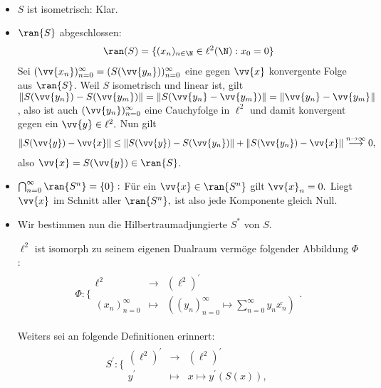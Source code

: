 \begin{solution}
  \leavevmode \\
  \begin{itemize}
      \item $S$ ist isometrisch: Klar.
      \item $\ran{S}$ abgeschlossen:
      \begin{align*}
        \ran(S) = \{(x_n)_{n \in \N} \in \ell^2(\N): x_0 = 0\}
      \end{align*}
      Sei $(\vv{x_n})_{n=0}^\infty =
      (S(\vv{y_n}))_{n=0}^\infty$ eine gegen $\vv{x}$ konvergente Folge aus $\ran{S}$. Weil $S$ isometrisch und linear ist, gilt
      $\| S(\vv{y_n}) - S(\vv{y_m})\|
      = \| S(\vv{y_n} - \vv{y_m}) \|
      = \| \vv{y_n} - \vv{y_m} \|$, also ist auch $(\vv{y_n})_{n=0}^\infty$ eine Cauchyfolge in $\ell^2$ und damit konvergent gegen ein $\vv{y} \in \ell^2.$ Nun gilt
      \begin{align*}
       \| S(\vv{y}) - \vv{x} \| \leq
       \| S(\vv{y}) - S(\vv{y_n}) \| + \| S(\vv{y_n}) - \vv{x} \|
       \stackrel{n \rightarrow \infty}{\longrightarrow} 0,
      \end{align*}
      also $\vv{x} = S(\vv{y}) \in \ran{S}$.
      \item $\bigcap_{n=0}^\infty \ran{S^n} = \{0\}:$ Für ein $\vv{x} \in \ran{S^n}$ gilt $\vv{x}_n = 0.$ Liegt $\vv{x}$ im Schnitt aller $\ran{S^n},$ ist also jede Komponente gleich Null.
      \item Wir bestimmen nun die Hilbertraumadjungierte $S^*$ von $S.$

      $\ell^2$ ist isomorph zu seinem eigenen Dualraum vermöge folgender Abbildung $\Phi$:
      \begin{align*}
            \Phi: \Bigg\{\begin{matrix}
       \ell^2 & \rightarrow & (\ell^2)^\prime \\
      (x_n)_{n=0}^\infty & \mapsto & ((y_n)_{n=0}^\infty \mapsto \sum_{n=0}^\infty y_n \overline{x_n})
        \end{matrix}.
        \end{align*}

      Weiters sei an folgende Definitionen erinnert:
      \begin{align*}
        S^{\prime}: \Bigg\{\begin{matrix}
       (\ell^2)^{\prime} &\rightarrow & (\ell^2)^{\prime} \\
       y^{\prime} &\mapsto &x \mapsto y^{\prime}(S(x)),
        \end{matrix}
      \end{align*}


\end{itemize}
\end{solution}
